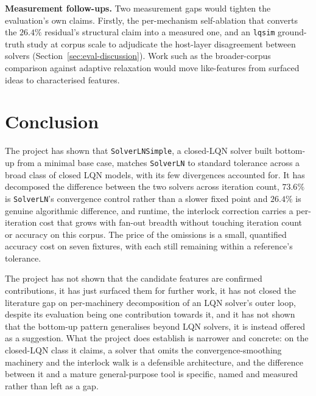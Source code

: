 \textbf{Measurement follow-ups.} Two measurement gaps would tighten the evaluation's own claims. Firstly, the per-mechanism self-ablation that converts the $26.4\%$ residual's structural claim into a measured one, and an \texttt{lqsim} ground-truth study at corpus scale to adjudicate the host-layer disagreement between solvers (Section~\ref{sec:eval-discussion}). Work such as the broader-corpus comparison against adaptive relaxation would move like-features from surfaced ideas to characterised features.




\section{Conclusion}
\label{sec:concl-conclusion}

The project has shown that \texttt{SolverLNSimple}, a closed-LQN solver built bottom-up from a minimal base case, matches \texttt{SolverLN} to standard tolerance across a broad class of closed LQN models, with its few divergences accounted for. It has decomposed the difference between the two solvers across iteration count, $73.6\%$ is \texttt{SolverLN}'s convergence control rather than a slower fixed point and $26.4\%$ is genuine algorithmic difference, and runtime, the interlock correction carries a per-iteration cost that grows with fan-out breadth without touching iteration count or accuracy on this corpus. The price of the omissions is a small, quantified accuracy cost on seven fixtures, with each still remaining within a reference's tolerance.

The project has not shown that the candidate features are confirmed contributions, it has just surfaced them for further work, it has not closed the literature gap on per-machinery decomposition of an LQN solver's outer loop, despite its evaluation being one contribution towards it, and it has not shown that the bottom-up pattern generalises beyond LQN solvers, it is instead offered as a suggestion. What the project does establish is narrower and concrete: on the closed-LQN class it claims, a solver that omits the convergence-smoothing machinery and the interlock walk is a defensible architecture, and the difference between it and a mature general-purpose tool is specific, named and measured rather than left as a gap.
